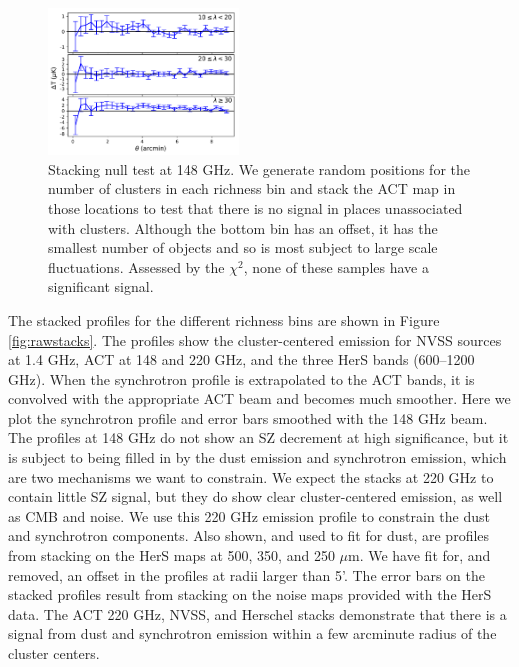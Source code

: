 \documentclass[a4paper,fleqn,usenatbib]{mnras}
\begin{document}
\begin{figure}
  \centering
  \includegraphics[width=0.45\textwidth]{rand_stacks_tophat.pdf}

\caption{Stacking null test at 148 GHz. We generate random positions for the number of clusters in each richness bin and stack the ACT map in those locations to test that there is no signal in places unassociated with clusters.  {Although the bottom bin has an offset, it has the smallest number of objects and so is most subject to large scale fluctuations.  Assessed by the $\chi^2$, none of these samples have a significant signal.}}  
  \label{fig:randstacks}
\end{figure}




The stacked profiles for the different richness bins are shown in Figure \ref{fig:rawstacks}. 
The profiles show the cluster-centered emission for NVSS sources at 1.4 GHz, ACT at 148 and 220 GHz, and the three HerS bands (600--1200 GHz). 
When the synchrotron profile is extrapolated to the ACT bands, it is convolved with the appropriate ACT beam and becomes much smoother.
Here we plot the synchrotron profile and error bars smoothed with the 148 GHz beam.
The profiles at 148 GHz do not show an SZ decrement at high significance, but it is subject to being filled in by the dust emission and synchrotron emission, which are two mechanisms we want to constrain.
We expect the stacks at 220 GHz to contain little SZ signal, but they do show clear cluster-centered emission, as well as CMB and noise. 
We use this 220 GHz emission profile to constrain the dust and synchrotron components. 
Also shown, and used to fit for dust, are profiles from stacking on the HerS maps at 500, 350, and 250 $\mu$m. 
We have fit for, and removed, an offset in the profiles at radii larger than 5'.
The error bars on the stacked profiles result from stacking on the noise maps provided with the HerS data. 
The ACT 220 GHz, NVSS, and Herschel stacks demonstrate that there is a signal from dust and synchrotron emission within a few arcminute radius of the cluster centers.
\end{document}
